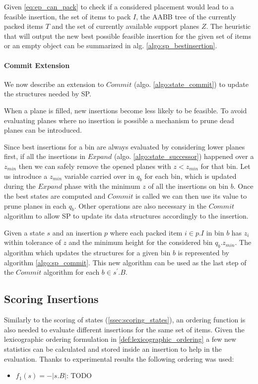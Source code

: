 Given \cref{eq:ep_can_pack} to check if a considered placement would lead to a feasible insertion, the set of items to pack $I$, the AABB tree of the currently packed items $T$ and the set of currently available support planes $Z$.
The heuristic that will output the new best possible feasible insertion for the given set of items or an empty object can be summarized in alg. \ref{algo:sp_bestinsertion}. 




\paragraph*{Commit Extension}
We now describe an extension to $Commit$ (algo. \ref{algo:state_commit}) to update the structures needed by SP.

When a plane is filled, new insertions become less likely to be feasible. 
To avoid evaluating planes where no insertion is possible a mechanism to prune dead planes can be introduced.

Since best insertions for a bin are always evaluated by considering lower planes first, if all the insertions in $Expand$ (algo. \ref{algo:state_successor}) happened over a $z_{min}$ then we can safely remove the opened planes with $z < z_{min}$ for that bin.
Let us introduce a $z_{min}$ variable carried over in $q_b$ for each bin, which is updated during the $Expand$ phase with the minimum $z$ of all the insertions on bin $b$.
Once the best states are computed and $Commit$ is called we can then use its value to prune planes in each $q_b$.
Other operations are also necessary in the $Commit$ algorithm to allow SP to update its data structures accordingly to the insertion.

Given a state $s$ and an insertion $p$ where each packed item $i \in p.I$ in bin $b$ has $z_i$ within tolerance of $z$ and the minimum height for the considered bin $q_b.z_{min}$.
The algorithm which updates the structures for a given bin $b$ is represented by algorithm \ref{algo:sp_commit}.
This new algorithm can be used as the last step of the $Commit$ algorithm for each $b \in s^\prime.B$.



\subsection{Scoring Insertions}
\label{ssec:scoring_insertions}%
Similarly to the scoring of states (\cref{ssec:scoring_states}), an ordering function is also needed to evaluate different insertions for the same set of items.
Given the lexicographic ordering formulation in \cref{def:lexicographic_ordering} a few new statistics can be calculated and stored inside an insertion to help in the evaluation.
Thanks to experimental results the following ordering was used:
\begin{itemize}
    \item $f_1(s) = -|s.B|$: TODO
\end{itemize}